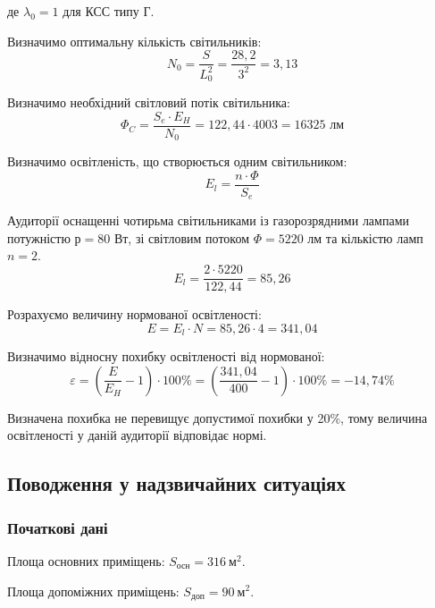 \documentclass[a4paper,ukrainian,utf8,nocolumnsxix,floatsection,equationsection]{eskdtext}
\renewcommand\paragraph{\subsubsection}
\begin{document}
де $\lambda_0 = 1$ для КСС типу Г. 

Визначимо оптимальну кількість світильників:
\begin{equation}
	N_0 = \frac{S}{L_0^2} = \frac{28,2}{3^2} = 3,13
\end{equation}

Визначимо необхідний світловий потік світильника:
\begin{equation}
	\Phi_C = \frac{S_e \cdot E_H}{N_0} = {122,44 \cdot 400}{3} = 16325 \text{ лм}
\end{equation}

Визначимо освітленість, що створюється одним світильником:
\begin{equation}
	E_l = \frac{n \cdot \Phi}{S_e}
\end{equation}

Аудиторії оснащенні чотирьма світильниками із газорозрядними лампами потужністю $р=80$ Вт, зі світловим потоком $\Phi=5220$ лм та кількістю ламп $n=2$.
\begin{equation}
	E_l = \frac{2 \cdot 5220}{122,44} = 85,26
\end{equation}

Розрахуємо величину нормованої освітленості: 
\begin{equation}
	E = E_l \cdot N = 85,26 \cdot 4 = 341,04
\end{equation}

Визначимо відносну похибку освітленості від нормованої:
\begin{equation}
	\varepsilon = \left( \frac{E}{E_H} - 1 \right) \cdot 100\% = 
		\left( \frac{341,04}{400} -1 \right) \cdot 100\% = -14,74\%
\end{equation}


Визначена похибка не перевищує допустимої похибки у 20\%, тому величина освітленості у даній аудиторії відповідає нормі.

\subsection{Поводження у надзвичайних ситуаціях}

\paragraph{Початкові дані}

Площа основних приміщень: $S_{\text{осн}} = 316\:\text{м}^2$.

Площа допоміжних приміщень: $S_{\text{доп}} = 90\:\text{м}^2$.
\end{document}
